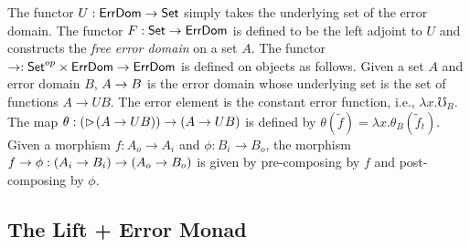 The functor $U : \textsf{ErrDom} \to \mathsf{Set}$ simply takes the underlying set of the error
domain. The functor $F : \mathsf{Set} \to \textsf{ErrDom}$ is defined to be the left adjoint to
$U$ and constructs the \emph{free error domain} on a set $A$.
%
The functor $\to : \mathsf{Set}^{op} \times \textsf{ErrDom} \to \textsf{ErrDom}$ is defined on objects
as follows. Given a set $A$ and error domain $B$, $A \to B$ is the error domain
whose underlying set is the set of functions $A \to UB$. The error element is
the constant error function, i.e., $\lambda x. \mho_B$. The map $\theta :
(\vartriangleright \hspace{-0.2em} (A \to UB)) \to (A \to UB)$ is defined by 
$\theta(\tilde{f}) = \lambda x . \theta_B (\tilde{f}_t)$.
%
Given a morphism $f : A_o \to A_i$ and $\phi : B_i \to B_o$, the morphism $f
\to \phi : (A_i \to B_i) \to (A_o \to B_o)$ is given by pre-composing by $f$
and post-composing by $\phi$.

\subsection{The Lift + Error Monad}\label{sec:lift-monad}

